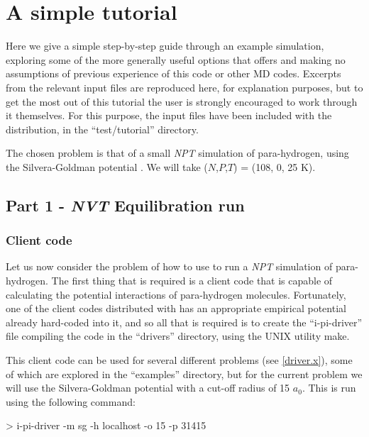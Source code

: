 \documentclass[11pt,english,fleqn]{report}
\newenvironment{code}{%
\footnotesize 
\verbatim
}{
\endverbatim
\normalsize
}
\begin{document}
\chapter{A simple tutorial}

\label{tutorial}

Here we give a simple step-by-step guide through an example
simulation, exploring
some of the more generally useful options that \ipi offers and making
no assumptions of previous experience of this code or other MD codes.
Excerpts from the relevant input files are reproduced here, for explanation
purposes, but to get the most out of this tutorial the user is strongly encouraged
to work through it themselves. For this purpose, the input files
have been included with the \ipi distribution, in the {}``test/tutorial''
directory.

The chosen problem is that of a small \emph{NPT} simulation of para-hydrogen, 
using the Silvera-Goldman potential \cite{silv-gold78jcp}. 
We will take (\(N\),\(P\),\(T\)) = (108, 0, 25 K).

\section{Part 1 - \emph{NVT} Equilibration run}

\label{part1}

\subsection{Client code}

Let us now consider the problem of how to use \ipi to run a \emph{NPT}
simulation of para-hydrogen. The first thing that is required is a
client code that is capable of calculating the potential interactions
of para-hydrogen molecules. Fortunately, one of the client codes distributed
with \ipi has an appropriate empirical potential already hard-coded
into it, and
so all that is required is to create the {}``i-pi-driver'' file
compiling the code in
the {}``drivers'' directory, using the UNIX utility make.

This client code can be used for several different problems
(see \ref{driver.x}), some of which
are explored in the {}``examples'' directory, but for the current problem
we will use the Silvera-Goldman potential with a cut-off radius
of 15 \(a_0\). This is run using the following command:

\begin{code}
> i-pi-driver -m sg -h localhost -o 15 -p 31415
\end{code}
\end{document}
